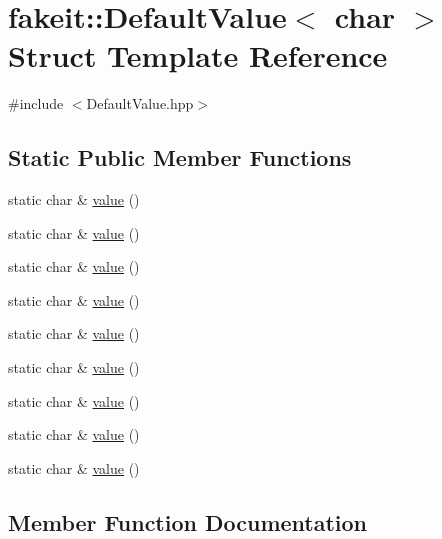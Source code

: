 \hypertarget{structfakeit_1_1DefaultValue_3_01char_01_4}{}\section{fakeit\+::Default\+Value$<$ char $>$ Struct Template Reference}
\label{structfakeit_1_1DefaultValue_3_01char_01_4}


{\ttfamily \#include $<$Default\+Value.\+hpp$>$}

\subsection*{Static Public Member Functions}
\begin{DoxyCompactItemize}
\item 
static char \& \mbox{\hyperlink{structfakeit_1_1DefaultValue_3_01char_01_4_ab19dfe44819ef26af2d403500d420968}{value}} ()
\item 
static char \& \mbox{\hyperlink{structfakeit_1_1DefaultValue_3_01char_01_4_ab19dfe44819ef26af2d403500d420968}{value}} ()
\item 
static char \& \mbox{\hyperlink{structfakeit_1_1DefaultValue_3_01char_01_4_ab19dfe44819ef26af2d403500d420968}{value}} ()
\item 
static char \& \mbox{\hyperlink{structfakeit_1_1DefaultValue_3_01char_01_4_ab19dfe44819ef26af2d403500d420968}{value}} ()
\item 
static char \& \mbox{\hyperlink{structfakeit_1_1DefaultValue_3_01char_01_4_ab19dfe44819ef26af2d403500d420968}{value}} ()
\item 
static char \& \mbox{\hyperlink{structfakeit_1_1DefaultValue_3_01char_01_4_ab19dfe44819ef26af2d403500d420968}{value}} ()
\item 
static char \& \mbox{\hyperlink{structfakeit_1_1DefaultValue_3_01char_01_4_ab19dfe44819ef26af2d403500d420968}{value}} ()
\item 
static char \& \mbox{\hyperlink{structfakeit_1_1DefaultValue_3_01char_01_4_ab19dfe44819ef26af2d403500d420968}{value}} ()
\item 
static char \& \mbox{\hyperlink{structfakeit_1_1DefaultValue_3_01char_01_4_ab19dfe44819ef26af2d403500d420968}{value}} ()
\end{DoxyCompactItemize}


\subsection{Member Function Documentation}
\mbox{\label{structfakeit_1_1DefaultValue_3_01char_01_4_ab19dfe44819ef26af2d403500d420968}} 
